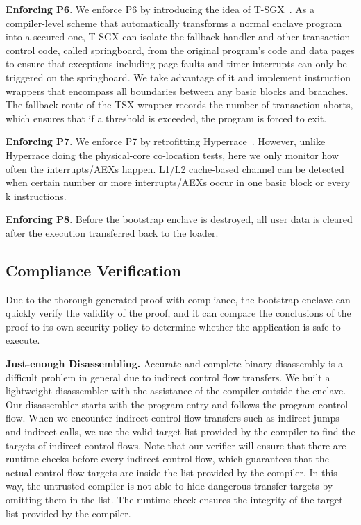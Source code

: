 {%
\vspace{3pt}\noindent\textbf{Enforcing P6}.
We enforce P6 by introducing the idea of T-SGX~\cite{shih2017t}. As a compiler-level scheme that automatically transforms a normal enclave program into a secured one, T-SGX can isolate the fallback handler and other transaction control code, called springboard, from the original program’s code and data pages to ensure that exceptions including page faults and timer interrupts can only be triggered on the springboard. We take advantage of it and implement instruction wrappers that encompass all boundaries between any basic blocks and branches. The fallback route of the TSX wrapper records the number of transaction aborts, which ensures that if a threshold is exceeded, the program is forced to exit. 

\vspace{3pt}\noindent\textbf{Enforcing P7}.
We enforce P7 by retrofitting Hyperrace~\cite{chen2018racing}. However, unlike Hyperrace doing the physical-core co-location tests, here we only monitor how often the interrupts/AEXs happen. L1/L2 cache-based channel can be detected when certain number or more interrupts/AEXs occur in one basic block or every k instructions.

\vspace{3pt}\noindent\textbf{Enforcing P8}. Before the bootstrap enclave is destroyed, all user data is cleared after the execution transferred back to the loader.

\subsection{Compliance Verification}
\label{subsec:verify}

Due to the thorough generated proof with compliance, the bootstrap enclave can quickly verify the validity of the proof, and it can compare the conclusions of the proof to its own security policy to determine whether the application is safe to execute.

\vspace{3pt}\noindent\textbf{Just-enough Disassembling.} Accurate and complete binary disassembly is a difficult problem in general due to indirect control flow transfers. We built a lightweight disassembler with the assistance of the compiler outside the enclave. Our disassembler starts with the program entry and follows the program control flow. When we encounter indirect control flow transfers such as indirect jumps and indirect calls, we use the valid target list provided by the compiler to find the targets of indirect control flows. Note that our verifier will ensure that there are runtime checks before every indirect control flow, which guarantees that the actual control flow targets are inside the list provided by the compiler. In this way, the untrusted compiler is not able to hide dangerous transfer targets by omitting them in the list. The runtime check ensures the integrity of the target list provided by the compiler.
}